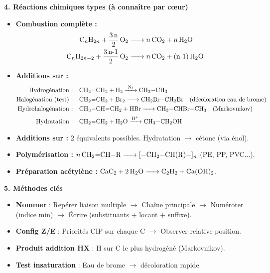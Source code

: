 \documentclass[11pt]{article}
\begin{document}
\begin{aretenir}
\textbf{4. Réactions chimiques types (à connaître par cœur)}
\begin{itemize}
  \item \textbf{Combustion complète :}
  \begin{align*}
    \ce{C_nH_{2n} + \frac{3n}{2} O2 &-> n CO2 + n H2O} \\
    \ce{C_nH_{2n-2} + \frac{3n-1}{2} O2 &-> n CO2 + (n-1) H2O}
  \end{align*}
  \item \textbf{Additions sur  :}
  \begin{align*}
    \text{Hydrogénation :} &\quad \ce{CH2=CH2 + H2 ->[Ni] CH3-CH3} \\
    \text{Halogénation (test) :} &\quad \ce{CH2=CH2 + Br2 -> CH2Br-CH2Br} \quad \text{(décoloration eau de brome)} \\
    \text{Hydrohalogénation :} &\quad \ce{CH3-CH=CH2 + HBr -> CH3-CHBr-CH3} \quad \text{(Markovnikov)} \\
    \text{Hydratation :} &\quad \ce{CH2=CH2 + H2O ->[H^+] CH3-CH2OH}
  \end{align*}
  \item \textbf{Additions sur  :} 2 équivalents possibles. Hydratation $\to$ cétone (via énol).
  \item \textbf{Polymérisation :} $\ce{n CH2=CH-R -> [-CH2-CH(R)-]_n}$ (PE, PP, PVC...).
  \item \textbf{Préparation acétylène :} $\ce{CaC2 + 2 H2O -> C2H2 + Ca(OH)2}$.
\end{itemize}

\textbf{5. Méthodes clés}
\begin{itemize}
  \item \textbf{Nommer} : Repérer liaison multiple $\to$ Chaîne principale $\to$ Numéroter (indice min) $\to$ Écrire (substituants + locant + suffixe).
  \item \textbf{Config Z/E} : Priorités CIP sur chaque C $\to$ Observer relative position.
  \item \textbf{Produit addition HX} : H sur C le plus hydrogéné (Markovnikov).
  \item \textbf{Test insaturation} : Eau de brome $\to$ décoloration rapide.
\end{itemize}
\end{aretenir}
\end{document}
